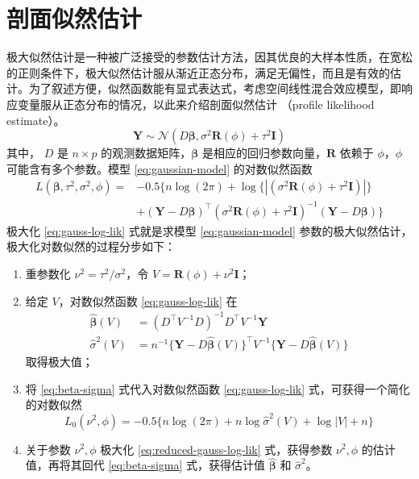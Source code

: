 \documentclass[12pt,a4paper,UTF8,twoside]{book}
\providecommand{\tightlist}{%
  \setlength{\itemsep}{0pt}\setlength{\parskip}{0pt}}
\theoremstyle{definition}
\theoremstyle{definition}
\theoremstyle{definition}
\theoremstyle{remark}
\begin{document}
\hypertarget{sec:profile-likelihood}{%
\section{剖面似然估计}\label{sec:profile-likelihood}}

极大似然估计是一种被广泛接受的参数估计方法，因其优良的大样本性质，在宽松的正则条件下，极大似然估计服从渐近正态分布，满足无偏性，而且是有效的估计。为了叙述方便，似然函数能有显式表达式，考虑空间线性混合效应模型，即响应变量服从正态分布的情况，以此来介绍剖面似然估计
（profile likelihood estimate）\citep{Diggle2007}。 \begin{equation}
\mathbf{Y} \sim \mathcal{N}(D\boldsymbol{\beta},\sigma^2 \mathbf{R}(\phi) + \tau^2\mathbf{I})
\label{eq:gaussian-model}
\end{equation} \noindent 其中， \(D\) 是 \(n \times p\)
的观测数据矩阵，\(\boldsymbol{\beta}\)
是相应的回归参数向量，\(\mathbf{R}\) 依赖于 \(\phi\)，\(\phi\)
可能含有多个参数。模型 \eqref{eq:gaussian-model} 的对数似然函数
\begin{equation}
\begin{aligned}
L(\boldsymbol{\beta},\tau^2,\sigma^2,\phi) = {} 
 & - 0.5\{ n\log(2\pi) + \log\{|(\sigma^2\mathbf{R}(\phi)+\tau^2\mathbf{I})|\} \\
 & + (\mathbf{Y} - D\boldsymbol{\beta})^{\top}(\sigma^2\mathbf{R}(\phi)+\tau^2\mathbf{I})^{-1}(\mathbf{Y} - D\boldsymbol{\beta}) \}  
\end{aligned} \label{eq:gauss-log-lik}
\end{equation} \noindent 极大化 \eqref{eq:gauss-log-lik} 式就是求模型
\eqref{eq:gaussian-model}
参数的极大似然估计，极大化对数似然的过程分步如下：

\begin{enumerate}
\def\labelenumi{\arabic{enumi}.}
\tightlist
\item
  重参数化 \(\nu^2 = \tau^2/\sigma^2\)，令
  \(V = \mathbf{R}(\phi) + \nu^2 \mathbf{I}\)；
\item
  给定 \(V\)，对数似然函数 \eqref{eq:gauss-log-lik} 在 \begin{equation}
  \begin{aligned}
     \hat{\boldsymbol{\beta}}(V) & =  (D^{\top} V^{-1} D)^{-1} D^{\top} V^{-1}\mathbf{Y} \\
     \hat{\sigma}^2(V)           & =  n^{-1} \{\mathbf{Y} - D\hat{\boldsymbol{\beta}}(V)\}^{\top} V^{-1} \{\mathbf{Y} - D\hat{\boldsymbol{\beta}}(V)\}
  \end{aligned} \label{eq:beta-sigma}
  \end{equation} 取得极大值；
\item
  将 \eqref{eq:beta-sigma} 式代入对数似然函数 \eqref{eq:gauss-log-lik}
  式，可获得一个简化的对数似然 \begin{equation}
     L_{0}(\nu^2,\phi) = - 0.5\{ n\log(2\pi) + n\log \hat{\sigma}^2(V) + \log |V| + n \} \label{eq:reduced-gauss-log-lik}
  \end{equation}
\item
  关于参数 \(\nu^2, \phi\) 极大化 \eqref{eq:reduced-gauss-log-lik}
  式，获得参数 \(\nu^2, \phi\) 的估计值，再将其回代 \eqref{eq:beta-sigma}
  式，获得估计值 \(\hat{\boldsymbol{\beta}}\) 和 \(\hat{\sigma}^2\)。
\end{enumerate}
\end{document}
